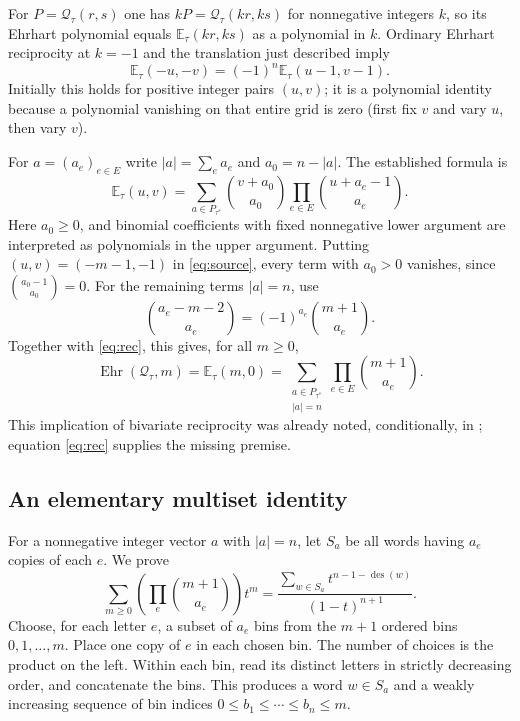 \documentclass[11pt]{article}
\newcommand{\E}{\mathbb E}
\newcommand{\Q}{\mathcal Q}
\newcommand{\des}{\operatorname{des}}
\begin{document}
For $P=\Q_\tau(r,s)$ one has $kP=\Q_\tau(kr,ks)$ for
nonnegative integers $k$, so its Ehrhart polynomial equals
$\E_\tau(kr,ks)$ as a polynomial in $k$. Ordinary Ehrhart
reciprocity at $k=-1$ and the translation just described imply
\begin{equation}\label{eq:rec}
 \E_\tau(-u,-v)=(-1)^n\E_\tau(u-1,v-1).
\end{equation}
Initially this holds for positive integer pairs $(u,v)$; it is a
polynomial identity because a polynomial vanishing on that entire
grid is zero (first fix $v$ and vary $u$, then vary $v$).

For $a=(a_e)_{e\in E}$ write $|a|=\sum_e a_e$ and $a_0=n-|a|$.
The established formula \cite[Lemma 4.1 and Equation (25)]{AC} is
\begin{equation}\label{eq:source}
 \E_\tau(u,v)=\sum_{a\in P_{\tau^*}}
       \binom{v+a_0}{a_0}\prod_{e\in E}\binom{u+a_e-1}{a_e}.
\end{equation}
Here $a_0\ge0$, and binomial coefficients with fixed nonnegative
lower argument are interpreted as polynomials in the upper argument.
Putting $(u,v)=(-m-1,-1)$ in \eqref{eq:source}, every term with
$a_0>0$ vanishes, since $\binom{a_0-1}{a_0}=0$.
For the remaining terms $|a|=n$, use
\[
 \binom{a_e-m-2}{a_e}=(-1)^{a_e}\binom{m+1}{a_e}.
\]
Together with \eqref{eq:rec}, this gives, for all $m\ge0$,
\begin{equation}\label{eq:count}
 \operatorname{Ehr}(\Q_\tau,m)=\E_\tau(m,0)
 =\sum_{\substack{a\in P_{\tau^*}\\|a|=n}}
        \prod_{e\in E}\binom{m+1}{a_e}.
\end{equation}
This implication of bivariate reciprocity was already noted,
conditionally, in \cite[Remark 7.3]{AC}; equation \eqref{eq:rec}
supplies the missing premise.

\subsection*{An elementary multiset identity}
For a nonnegative integer vector $a$ with $|a|=n$, let $S_a$
be all words having $a_e$ copies of each $e$. We prove
\begin{equation}\label{eq:word}
 \sum_{m\ge0}\left(\prod_e\binom{m+1}{a_e}\right)t^m
 =\frac{\displaystyle\sum_{w\in S_a}t^{n-1-\des(w)}}{(1-t)^{n+1}}.
\end{equation}
Choose, for each letter $e$, a subset of $a_e$ bins from the
$m+1$ ordered bins $0,1,\ldots,m$. Place one copy of $e$ in each
chosen bin. The number of choices is the product on the left.
Within each bin, read its distinct letters in strictly decreasing
order, and concatenate the bins. This produces a word $w\in S_a$
and a weakly increasing sequence of bin indices
$0\le b_1\le\cdots\le b_n\le m$.
\end{document}
